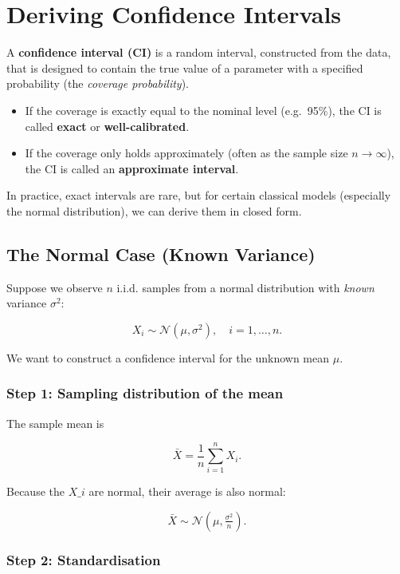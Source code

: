 \documentclass[
  letterpaper,
  DIV=11,
  numbers=noendperiod]{scrreprt}
\providecommand{\tightlist}{%
  \setlength{\itemsep}{0pt}\setlength{\parskip}{0pt}}
\theoremstyle{definition}
\theoremstyle{plain}
\theoremstyle{definition}
\theoremstyle{remark}
\begin{document}
\section{Deriving Confidence
Intervals}\label{deriving-confidence-intervals}

A \textbf{confidence interval (CI)} is a random interval, constructed
from the data, that is designed to contain the true value of a parameter
with a specified probability (the \emph{coverage probability}).

\begin{itemize}
\tightlist
\item
  If the coverage is exactly equal to the nominal level (e.g.~95\%), the
  CI is called \textbf{exact} or \textbf{well-calibrated}.
\item
  If the coverage only holds approximately (often as the sample size
  \(n \to \infty\)), the CI is called an \textbf{approximate interval}.
\end{itemize}

In practice, exact intervals are rare, but for certain classical models
(especially the normal distribution), we can derive them in closed form.

\subsection{The Normal Case (Known
Variance)}\label{the-normal-case-known-variance}

Suppose we observe \(n\) i.i.d. samples from a normal distribution with
\emph{known} variance \(\sigma^2\):

\[
X_i \sim \mathcal{N}(\mu, \sigma^2), \quad i=1,\dots,n.
\]

We want to construct a confidence interval for the unknown mean \(\mu\).

\subsubsection{Step 1: Sampling distribution of the
mean}\label{step-1-sampling-distribution-of-the-mean}

The sample mean is

\[
\bar{X} = \frac{1}{n}\sum_{i=1}^n X_i.
\]

Because the \(X\_i\) are normal, their average is also normal:

\[
\bar{X} \sim \mathcal{N}\!\left(\mu, \tfrac{\sigma^2}{n}\right).
\]

\subsubsection{Step 2: Standardisation}\label{step-2-standardisation}
\end{document}
